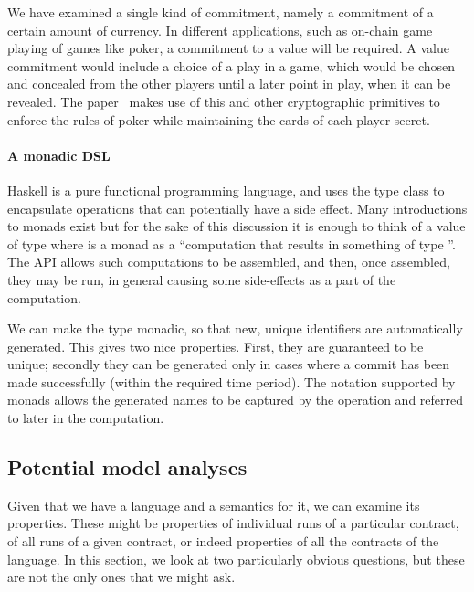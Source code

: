 \documentclass[
      acmsmall
    , screen
  ]{acmart}
\begin{document}
We have examined a single kind of commitment, namely a commitment of a certain amount of currency. In different 
applications, such as on-chain game playing of games like poker, a commitment to a value will be required. A value 
commitment would include a choice of a play in a game, which would be chosen and concealed from the other players until 
a later point in play, when it can be revealed. The paper~\cite{kumaresan2015use} makes use of this and other 
cryptographic primitives to enforce the rules of poker while maintaining the cards of each player secret.

\paragraph{A monadic DSL}

Haskell is a pure functional programming language, and uses the  type class to encapsulate
operations that can potentially have a side effect. Many introductions to monads exist \cite{wadler1990comprehending} 
but for the sake of this discussion it is enough to think of a value of type  where  
is a monad as a ``computation that results in something of type ''. The  API 
allows such computations to be assembled, and then, once assembled, they may be run, in general causing some 
side-effects as a part of the computation.

We can make the  type monadic, so that new, unique identifiers are automatically generated. This gives two nice properties. First, they are guaranteed to be unique; secondly they can be generated only in cases where a commit has been made successfully (within the required time period). The 
 notation supported by monads allows the generated names to be captured by the  operation and referred to later in the computation.


\subsection{Potential model analyses}
\label{section:analysis}

Given that we have a language and a semantics for it, we can examine its properties. These might be properties of 
individual runs of a particular contract, of all runs of a given contract, or indeed properties of all the contracts of 
the language. In this section, we look at two particularly obvious questions, but these are not the only ones that we 
might ask.
\end{document}
